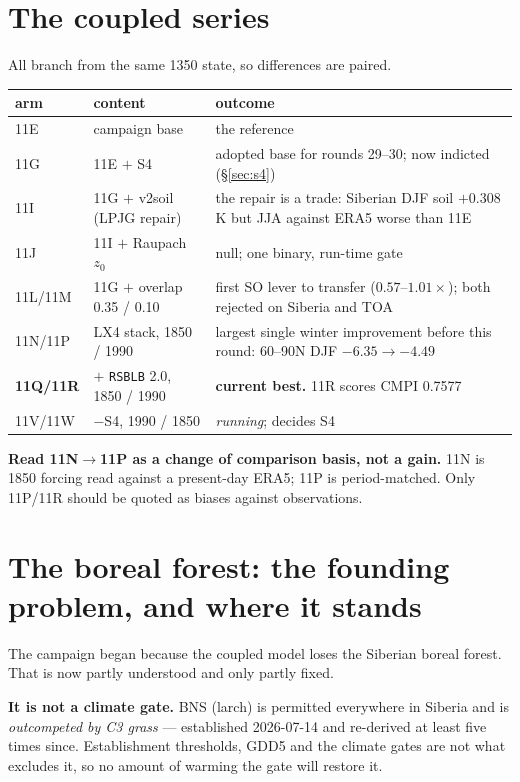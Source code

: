 \documentclass[10pt]{article}
\begin{document}
\section{The coupled series}\label{sec:coupled}
All branch from the same 1350 state, so differences are paired.

\begin{center}\footnotesize
\begin{tabular}{p{} p{} p{}}
\toprule
arm & content & outcome \\
\midrule
11E & campaign base & the reference \\
11G & 11E $+$ S4 & adopted base for rounds 29--30; now indicted (\S\ref{sec:s4}) \\
11I & 11G $+$ v2soil (LPJG repair) & the repair is a trade: Siberian DJF soil $+0.308$\,K
but JJA against ERA5 worse than 11E \\
11J & 11I $+$ Raupach $z_0$ & null; one binary, run-time gate \\
11L/11M & 11G $+$ overlap 0.35 / 0.10 & first SO lever to transfer ($0.57$--$1.01\times$);
both rejected on Siberia and TOA \\
11N/11P & LX4 stack, 1850 / 1990 & largest single winter improvement before this round:
60--90N DJF $-6.35\to-4.49$ \\
\textbf{11Q/11R} & $+$ \texttt{RSBLB} 2.0, 1850 / 1990 & \textbf{current best.} 11R scores
CMPI 0.7577 \\
11V/11W & $-$S4, 1990 / 1850 & \emph{running}; decides S4 \\
\bottomrule
\end{tabular}
\end{center}

\textbf{Read 11N$\to$11P as a change of comparison basis, not a gain.} 11N is 1850 forcing
read against a present-day ERA5; 11P is period-matched. Only 11P/11R should be quoted as
biases against observations.

\section{The boreal forest: the founding problem, and where it stands}\label{sec:boreal}
The campaign began because the coupled model loses the Siberian boreal forest. That is now
partly understood and only partly fixed.

\textbf{It is not a climate gate.} BNS (larch) is permitted everywhere in Siberia and is
\emph{outcompeted by C3 grass} --- established 2026-07-14 and re-derived at least five
times since. Establishment thresholds, GDD5 and the climate gates are not what excludes
it, so no amount of warming the gate will restore it.
\end{document}
